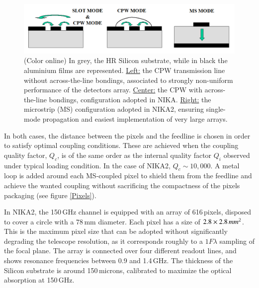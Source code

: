 \documentclass[]{aa} %
\begin{document}
\begin{figure}[h]
   \centering
    \includegraphics[width=.95\linewidth]{CPWvsMS.png}
      \caption{(Color online) In grey, the HR Silicon substrate, while in black the aluminium films are represented. \underline{Left:} the CPW transmission line without across-the-line bondings, associated to strongly non-uniform performance of the detectors array. \underline{Center:} the CPW with across-the-line bondings, configuration adopted in NIKA. \underline{Right:} the microstrip (MS) configuration adopted in NIKA2, ensuring single-mode propagation and easiest implementation of very large arrays.}
         \label{CPWvsMS}
\end{figure}

In both cases, the distance between the pixels and the feedline is chosen in
order to satisfy optimal coupling conditions. These are achieved when the
coupling quality factor, $Q_c$, is of the same order as the internal quality
factor $Q_i$ observed under typical loading condition. In the case of NIKA2,
$Q_c\sim10,000$. A metal loop is added around each MS-coupled pixel to shield
them from the feedline and achieve the wanted coupling without sacrificing the
compactness of the pixels packaging (see figure \ref{Pixels}).

In NIKA2, the 150\,GHz channel is equipped with an array of 616\,pixels,
disposed to cover a circle with a 78\,mm diameter. Each pixel has a size of
$2.8\times2.8\textrm\,{mm}^2$. This is the maximum pixel size that can be
adopted without significantly degrading the telescope resolution, as it
corresponds roughly to a $1 F \lambda$ sampling of the focal plane. The array is
connected over four different readout lines, and shows resonance frequencies
between 0.9 and 1.4\,GHz. The thickness of the Silicon substrate is around
150\,microns, calibrated to maximize the optical absorption at 150\,GHz.
\end{document}
